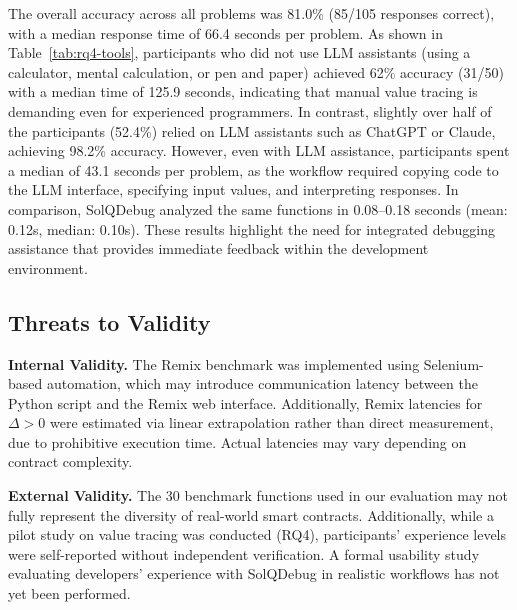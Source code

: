 \documentclass[pdflatex,sn-basic]{sn-jnl}%
\theoremstyle{thmstyleone}%
\theoremstyle{thmstyletwo}%
\theoremstyle{thmstylethree}%
\begin{document}
The overall accuracy across all problems was 81.0\% (85/105 responses correct),
with a median response time of 66.4 seconds per problem.
As shown in Table~\ref{tab:rq4-tools}, participants who did not use LLM assistants (using a calculator, mental calculation, or pen and paper) achieved 62\% accuracy (31/50) with a median time of 125.9 seconds,
indicating that manual value tracing is demanding even for experienced programmers.
In contrast, slightly over half of the participants (52.4\%) relied on LLM assistants such as ChatGPT or Claude, achieving 98.2\% accuracy.
However, even with LLM assistance, participants spent a median of 43.1 seconds per problem,
as the workflow required copying code to the LLM interface, specifying input values, and interpreting responses.
In comparison, SolQDebug analyzed the same functions in 0.08--0.18 seconds (mean: 0.12s, median: 0.10s).
These results highlight the need for integrated debugging assistance that provides immediate feedback within the development environment.

\medskip
\noindent{}

\subsection{Threats to Validity}

\noindent\textbf{Internal Validity.}
The Remix benchmark was implemented using Selenium-based automation,
which may introduce communication latency between the Python script and the Remix web interface.
Additionally, Remix latencies for $\Delta > 0$ were estimated via linear extrapolation
rather than direct measurement, due to prohibitive execution time.
Actual latencies may vary depending on contract complexity.

\smallskip
\noindent\textbf{External Validity.}
The 30 benchmark functions used in our evaluation may not fully represent
the diversity of real-world smart contracts.
Additionally, while a pilot study on value tracing was conducted (RQ4),
participants' experience levels were self-reported without independent verification.
A formal usability study evaluating developers' experience with SolQDebug in realistic workflows has not yet been performed.
\end{document}
